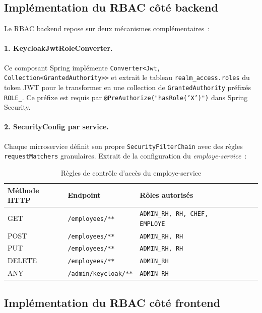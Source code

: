 \subsection{Implémentation du RBAC côté backend}

Le RBAC backend repose sur deux mécanismes complémentaires~:

\paragraph{1. KeycloakJwtRoleConverter.} Ce composant Spring implémente
\texttt{Converter<Jwt, Collection<GrantedAuthority>>} et extrait le tableau
\texttt{realm\_access.roles} du token JWT pour le transformer en une collection
de \texttt{GrantedAuthority} préfixés \texttt{ROLE\_}. Ce préfixe est requis par
\texttt{@PreAuthorize("hasRole('X')")} dans Spring Security.

\paragraph{2. SecurityConfig par service.} Chaque microservice définit son propre
\texttt{SecurityFilterChain} avec des règles \texttt{requestMatchers} granulaires.
Extrait de la configuration du \textit{employe-service}~:

\begin{table}[H]
\centering
\caption{Règles de contrôle d’accès du employe-service}
\label{tab:employe_acl}
\begin{tabularx}{\textwidth}{VlVlVLV}
\hline
\textbf{Méthode HTTP} & \textbf{Endpoint} & \textbf{Rôles autorisés} \\
\hline
GET & \texttt{/employees/**} & \texttt{ADMIN\_RH, RH, CHEF, EMPLOYE} \\
\hline
POST & \texttt{/employees/**} & \texttt{ADMIN\_RH, RH} \\
\hline
PUT & \texttt{/employees/**} & \texttt{ADMIN\_RH, RH} \\
\hline
DELETE & \texttt{/employees/**} & \texttt{ADMIN\_RH} \\
\hline
ANY & \texttt{/admin/keycloak/**} & \texttt{ADMIN\_RH} \\
\hline
\end{tabularx}
\end{table}

\subsection{Implémentation du RBAC côté frontend}

